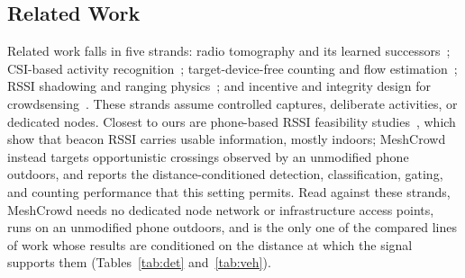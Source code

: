 \documentclass[conference,10pt]{IEEEtran}
\begin{document}
\subsection{Related Work}
Related work falls in five strands: radio tomography and its learned
successors~\cite{wilson2010,wilson2011,alippi2016,wu2024,li2024,ma2019wifi}; CSI-based
activity recognition~\cite{wong2024,sanchez2020}; target-device-free counting and flow estimation~\cite{khan2023,zhou2020}; RSSI shadowing and ranging
physics~\cite{ramirez2021,bai2020,januszkiewicz2018,li2024}; and incentive
and integrity design for crowdsensing~\cite{zhang2022,wang2018,casar2022,antonioli2020,cai2024,ryan2013woot}.
These strands assume controlled captures, deliberate activities, or
dedicated nodes. Closest to ours are phone-based RSSI feasibility
studies~\cite{ramirez2021,milano2024,bai2020}, which show that beacon RSSI
carries usable information, mostly indoors; MeshCrowd instead targets
opportunistic crossings observed by an unmodified phone outdoors, and reports
the distance-conditioned detection, classification, gating, and counting performance
that this setting permits. Read against these strands, MeshCrowd needs no
dedicated node network or infrastructure access points, runs on an unmodified
phone outdoors, and is the only one of the compared lines of work whose
results are conditioned on the distance at which the signal supports them
(Tables~\ref{tab:det} and~\ref{tab:veh}).
\end{document}
